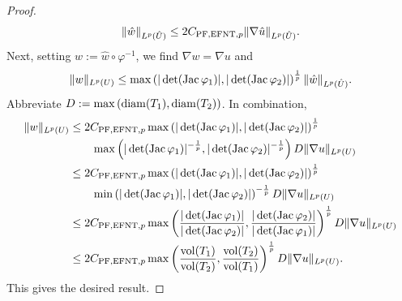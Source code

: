\documentclass[10pt,letterpaper]{article}
\begin{document}
\begin{proof}
\begin{align*}
        \| \hat w \|_{L^{p}(\hat U)}
        \leq 
        2 C_{{\rm PF},{\rm EFNT},p}
        \| \nabla \hat u \|_{L^{p}(\hat U)}
        .
    \end{align*}
    Next, setting $w := \hat w \circ \varphi^{-1}$, we find $\nabla w = \nabla u$ and 
    \begin{align*}
        \| w \|_{L^{p}(U)}
        \leq 
        \max\left( 
            |\det(\operatorname{{\rm Jac}} \varphi_1)|
            ,
            |\det(\operatorname{{\rm Jac}} \varphi_2)|
        \right)^{\frac 1 p}
        \| \hat w \|_{L^{p}(\hat U)}
        .
    \end{align*}
    Abbreviate $D := \max\left( {\operatorname{diam}}(T_1), {\operatorname{diam}}(T_2) \right)$. In combination, 
    \begin{align*}
        \| w \|_{L^{p}(U)}
        &\leq 
        2 C_{{\rm PF},{\rm EFNT},p}
        \max\left( 
            |\det(\operatorname{{\rm Jac}} \varphi_1)|
            ,
            |\det(\operatorname{{\rm Jac}} \varphi_2)|
        \right)^{\frac 1 p}
        \\&\qquad 
        \max\left( 
            |\det(\operatorname{{\rm Jac}} \varphi_1)|^{-\frac 1 p} 
            ,
            |\det(\operatorname{{\rm Jac}} \varphi_2)|^{-\frac 1 p} 
        \right)
        D
        \| \nabla u \|_{L^{p}(U)}
        \\&
        \leq 
        2 C_{{\rm PF},{\rm EFNT},p}
        \max\left( 
            |\det(\operatorname{{\rm Jac}} \varphi_1)|
            ,
            |\det(\operatorname{{\rm Jac}} \varphi_2)|
        \right)^{\frac 1 p}
        \\&\qquad 
        \min\left( 
            |\det(\operatorname{{\rm Jac}} \varphi_1)|
            ,
            |\det(\operatorname{{\rm Jac}} \varphi_2)| 
        \right)^{-\frac 1 p} 
        D
        \| \nabla u \|_{L^{p}(U)}
        \\&
        \leq 
        2 C_{{\rm PF},{\rm EFNT},p}
        \max\left( 
            \frac{ |\det(\operatorname{{\rm Jac}} \varphi_1)| }{ |\det(\operatorname{{\rm Jac}} \varphi_2)| }
            ,
            \frac{ |\det(\operatorname{{\rm Jac}} \varphi_2)| }{ |\det(\operatorname{{\rm Jac}} \varphi_1)| }
        \right)^{\frac 1 p}
        D
        \| \nabla u \|_{L^{p}(U)}
        \\&
        \leq 
        2 C_{{\rm PF},{\rm EFNT},p}
        \max\left( 
            \frac{ \operatorname{vol}(T_1) }{ \operatorname{vol}(T_2) }
            ,
            \frac{ \operatorname{vol}(T_2) }{ \operatorname{vol}(T_1) }
        \right)^{\frac 1 p}
        D
        \| \nabla u \|_{L^{p}(U)}
        .
    \end{align*}
    This gives the desired result. 
\end{proof}
\end{document}
